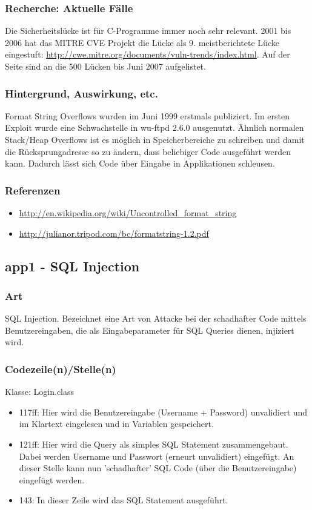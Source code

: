 \documentclass[12pt,a4paper,titlepage,oneside]{scrartcl}
\begin{document}
\subsubsection{Recherche: Aktuelle Fälle}
\noindent		 
Die Sicherheitslücke ist für C-Programme immer noch sehr relevant. 2001 bis 2006 hat das MITRE CVE Projekt die Lücke als 9. meistberichtete Lücke eingestuft: \url{http://cwe.mitre.org/documents/vuln-trends/index.html}. Auf der Seite sind an die 500 Lücken bis Juni 2007 aufgelistet.
\subsubsection{Hintergrund, Auswirkung, etc.}
\noindent
Format String Overflows wurden im Juni 1999 erstmals publiziert. Im ersten Exploit wurde eine Schwachstelle in wu-ftpd 2.6.0 ausgenutzt. Ähnlich normalen Stack/Heap Overflows ist es möglich in Speicherbereiche zu schreiben und damit die Rücksprungadresse so zu ändern, dass beliebiger Code ausgeführt werden kann. Dadurch lässt sich Code über Eingabe in Applikationen schleusen. 
\subsubsection{Referenzen}
\noindent
\begin{itemize}  
\item \url{http://en.wikipedia.org/wiki/Uncontrolled_format_string}
\item \url{http://julianor.tripod.com/bc/formatstring-1.2.pdf}
\end{itemize}

\subsection{app1 - SQL Injection}
\noindent

\subsubsection{Art}
\noindent
SQL Injection. Bezeichnet eine Art von Attacke bei der schadhafter Code mittels Benutzereingaben, die als Eingabeparameter für SQL Queries dienen, injiziert wird.

\subsubsection{Codezeile(n)/Stelle(n)}
\noindent
Klasse: Login.class
\begin{itemize}  
\item 117ff: Hier wird die Benutzereingabe (Username + Password) unvalidiert und im Klartext eingelesen und in Variablen gespeichert.
\item 121ff:	Hier wird die Query als simples SQL Statement zusammengebaut. Dabei werden Username und Passwort (erneurt unvalidiert) eingefügt. 
An dieser Stelle kann nun 'schadhafter' SQL Code (über die Benutzereingabe) eingefügt werden.
\item 143: In dieser Zeile wird das SQL Statement ausgeführt.
\end{itemize}
\end{document}
